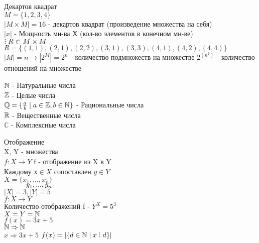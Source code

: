 \begin{definition} Декартов квадрат \\
	$ M = \{1, 2, 3, 4\} $\\
	$ |M \times M | = 16 $ - декартов квадрат (произведение множества на себя)\\
	$ |x| $ - Мощность мн-ва Х (кол-во элементов в конечном мн-ве)\\
	$ \divby R \subset M \times M $\\
	$ R =  \{ (1, 1), (2, 1), (2, 2), (3, 1), (3, 3), (4, 1), (4, 2), (4, 4) \}$ \\
	$ |M| = n \rightarrow |2^M| = 2^n $ - количество подмножеств на множестве
	$ 2^{(n^2)} $ - количество отношений на множестве \\
\end{definition}

\noindent
$ \mathbb{N} $ - Натуральные числа\\
$ \mathbb{Z} $ - Целые числа\\
$ \mathbb{Q} = \{ \frac{a}{b} \mid a \in \mathbb{Z}, b \in \mathbb{N} \} $ - Рациональные числа\\
$ \mathbb{R} $ - Вещественные числа\\
$ \mathbb{C} $ - Комплексные числа\\


\begin{definition} Отображение \\
X, Y - множества\\
$ f: X \rightarrow Y $ f - отображение из X в Y \\
Каждому $ х \in X $ сопоставлен $ y \in Y $ \\
$ X = \{ x_1, ..., x_n \} $ \\
$\hspace*{11mm} y_1, ..., y_n $\\
$ |X| = 3, |Y| = 5 $\\
$ f: X \rightarrow Y $\\
Количество отображений f - $ Y^X = 5^3 $ \\
$ X = Y = \mathbb{N} $ \\
$ f(x) = 3x + 5 $ \\
$ \mathbb{N} \Rightarrow \mathbb{N} $ \\
$ x \Rightarrow 3x+5 $ 
$ f(x) = |\{ d \in \N \mid x \divby d \}| $ 
\end{definition}

